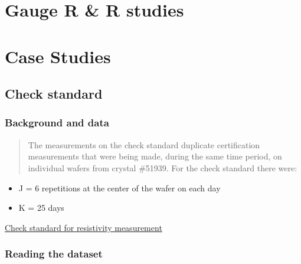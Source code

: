 \documentclass[]{book}
\newenvironment{Shaded}{\begin{snugshade}}{\end{snugshade}}
\newcommand{\DataTypeTok}[1]{\textcolor[rgb]{0.13,0.29,0.53}{#1}}
\newcommand{\KeywordTok}[1]{\textcolor[rgb]{0.13,0.29,0.53}{\textbf{#1}}}
\newcommand{\NormalTok}[1]{#1}
\newcommand{\OperatorTok}[1]{\textcolor[rgb]{0.81,0.36,0.00}{\textbf{#1}}}
\newcommand{\OtherTok}[1]{\textcolor[rgb]{0.56,0.35,0.01}{#1}}
\newcommand{\StringTok}[1]{\textcolor[rgb]{0.31,0.60,0.02}{#1}}
\providecommand{\tightlist}{%
  \setlength{\itemsep}{0pt}\setlength{\parskip}{0pt}}
\theoremstyle{definition}
\theoremstyle{definition}
\theoremstyle{definition}
\theoremstyle{remark}
\begin{document}
\hypertarget{gauge-r-r-studies}{%
\section{Gauge R \& R studies}\label{gauge-r-r-studies}}

\hypertarget{case-studies}{%
\section{Case Studies}\label{case-studies}}

\hypertarget{check-standard}{%
\subsection{Check standard}\label{check-standard}}

\hypertarget{background-and-data}{%
\subsubsection{Background and data}\label{background-and-data}}

\begin{quote}
The measurements on the check standard duplicate certification
measurements that were being made, during the same time period, on
individual wafers from crystal \#51939. For the check standard there
were:
\end{quote}

\begin{itemize}
\tightlist
\item
  J = 6 repetitions at the center of the wafer on each day
\item
  K = 25 days
\end{itemize}

\href{https://www.itl.nist.gov/div898/handbook/mpc/section6/mpc62.htm}{Check
standard for resistivity measurement}

\hypertarget{reading-the-dataset}{%
\subsubsection{Reading the dataset}\label{reading-the-dataset}}

\begin{Shaded}
\end{Shaded}
\end{document}
